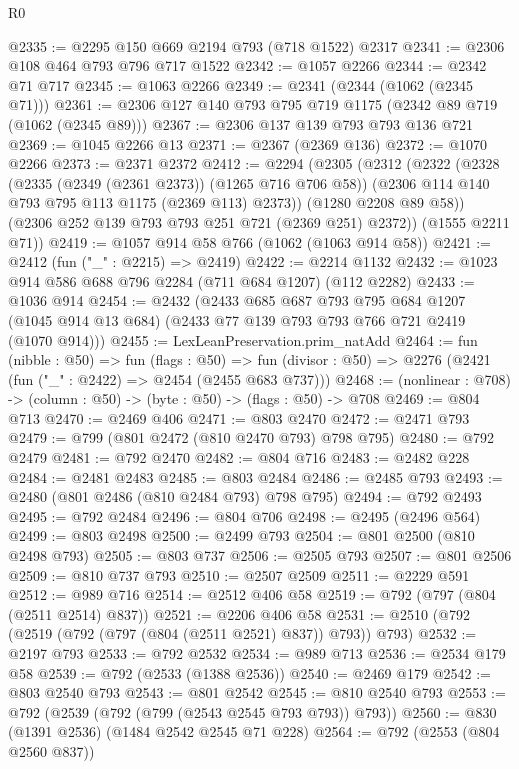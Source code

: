 \begin{lexlean}{R0}
\begin{coremodule}
@2335 := @2295 @150 @669 @2194 @793 (@718 @1522) @2317
@2341 := @2306 @108 @464 @793 @796 @717 @1522
@2342 := @1057 @2266
@2344 := @2342 @71 @717
@2345 := @1063 @2266
@2349 := @2341 (@2344 (@1062 (@2345 @71)))
@2361 := @2306 @127 @140 @793 @795 @719 @1175 (@2342 @89 @719 (@1062 (@2345 @89)))
@2367 := @2306 @137 @139 @793 @793 @136 @721
@2369 := @1045 @2266 @13
@2371 := @2367 (@2369 @136)
@2372 := @1070 @2266
@2373 := @2371 @2372
@2412 := @2294
    (@2305
      (@2312
        (@2322
          (@2328
            (@2335 (@2349 (@2361 @2373)) (@1265 @716 @706 @58))
            (@2306 @114 @140 @793 @795 @113 @1175 (@2369 @113) @2373))
          (@1280 @2208 @89 @58))
        (@2306 @252 @139 @793 @793 @251 @721 (@2369 @251) @2372))
      (@1555 @2211 @71))
@2419 := @1057 @914 @58 @766 (@1062 (@1063 @914 @58))
@2421 := @2412 (fun ("_" : @2215) => @2419)
@2422 := @2214 @1132
@2432 := @1023 @914 @586 @688 @796 @2284 (@711 @684 @1207) (@112 @2282)
@2433 := @1036 @914
@2454 := @2432
    (@2433
      @685
      @687
      @793
      @795
      @684
      @1207
      (@1045 @914 @13 @684)
      (@2433 @77 @139 @793 @793 @766 @721 @2419 (@1070 @914)))
@2455 := LexLeanPreservation.prim_natAdd
@2464 := fun (nibble : @50) =>
  fun (flags : @50) =>
  fun (divisor : @50) => @2276 (@2421 (fun ("_" : @2422) => @2454 (@2455 @683 @737)))
@2468 := (nonlinear : @708) -> (column : @50) -> (byte : @50) -> (flags : @50) -> @708
@2469 := @804 @713
@2470 := @2469 @406
@2471 := @803 @2470
@2472 := @2471 @793
@2479 := @799 (@801 @2472 (@810 @2470 @793) @798 @795)
@2480 := @792 @2479
@2481 := @792 @2470
@2482 := @804 @716
@2483 := @2482 @228
@2484 := @2481 @2483
@2485 := @803 @2484
@2486 := @2485 @793
@2493 := @2480 (@801 @2486 (@810 @2484 @793) @798 @795)
@2494 := @792 @2493
@2495 := @792 @2484
@2496 := @804 @706
@2498 := @2495 (@2496 @564)
@2499 := @803 @2498
@2500 := @2499 @793
@2504 := @801 @2500 (@810 @2498 @793)
@2505 := @803 @737
@2506 := @2505 @793
@2507 := @801 @2506
@2509 := @810 @737 @793
@2510 := @2507 @2509
@2511 := @2229 @591
@2512 := @989 @716
@2514 := @2512 @406 @58
@2519 := @792 (@797 (@804 (@2511 @2514) @837))
@2521 := @2206 @406 @58
@2531 := @2510 (@792 (@2519 (@792 (@797 (@804 (@2511 @2521) @837)) @793)) @793)
@2532 := @2197 @793
@2533 := @792 @2532
@2534 := @989 @713
@2536 := @2534 @179 @58
@2539 := @792 (@2533 (@1388 @2536))
@2540 := @2469 @179
@2542 := @803 @2540 @793
@2543 := @801 @2542
@2545 := @810 @2540 @793
@2553 := @792 (@2539 (@792 (@799 (@2543 @2545 @793 @793)) @793))
@2560 := @830 (@1391 @2536) (@1484 @2542 @2545 @71 @228)
@2564 := @792 (@2553 (@804 @2560 @837))

\end{coremodule}
\end{lexlean}
